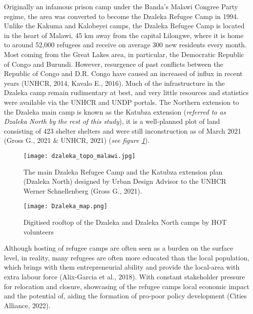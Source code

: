 \documentclass[11pt, a4paper, twoside]{report}
\begin{document}
Originally an infamous prison camp under the Banda's Malawi Congree Party regime, the area was converted to become the Dzaleka Refugee Camp in 1994. Unlike the Kakuma and Kalobeyei camps, the Dzaleka Refugee Camp is located in the heart of Malawi, 45 km away from the capital Lilongwe, where it is home to around 52,000 refugees and receive on average 300 new residents every month. Most coming from the Great Lakes area, in particular, the Democratic Republic of Congo and Burundi. However, resurgence of past conflicts between the Republic of Congo and D.R. Congo have caused an increased of influx in recent years (UNHCR, 2014, Kavalo E., 2016). Much of the infrastructure in the Dzaleka camp remain rudimentary at best, and very little resources and statistics were available via the UNHCR and UNDP portals. The Northern extension to the Dzaleka main camp is known as the Katubza extension (\textit{referred to as Dzaleka North by the rest of this study}), it is a well-planned plot of land consisting of 423 shelter shelters and were still inconstruction as of March 2021 (Gross G., 2021 \& UNHCR, 2021) (\textit{see figure \ref{fig:DZ_KA_PLAN}}).\\\par

\begin{figure}[H]
  \centering
  \texttt{[image: dzaleka\_topo\_malawi.jpg]}
  \caption{The main Dzaleka Refugee Camp and the Katubza extension plan (Dzaleka North) designed by Urban Design Advisor to the UNHCR Werner Schnellenberg (Gross G., 2021).}
\label{fig:DZ_KA_PLAN}
\end{figure}

\begin{figure}[H]
  \centering
  \texttt{[image: Dzaleka\_map.png]}
  \caption{Digitised rooftop of the Dzaleka and Dzaleka North camps by HOT volunteers}
\label{fig:Overview_DZK}
\end{figure}

Although hosting of refugee camps are often seen as a burden on the surface level, in reality, many refugees are often more educated than the local population, which brings with them entrepreneurial ability and provide the local-area with extra labour force (Alix-Garcia et al., 2018). With constant stakeholder pressure for relocation and closure, showcasing of the refugee camps local economic impact and the potential of, aiding the formation of pro-poor policy development (Cities Alliance, 2022).\\\par
\end{document}
